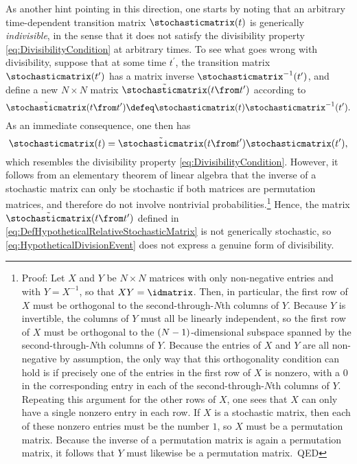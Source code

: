 \documentclass[12pt,english,prl,superscriptaddress,nobibnotes,nofootinbib]{revtex4-2}
\let\originalleft\left
\let\originalright\right
\renewcommand{\left}{\mathopen{}\mathclose\bgroup\originalleft}
\renewcommand{\right}{\aftergroup\egroup\originalright}
\begin{document}
As another hint pointing in this direction, one starts by noting that
an arbitrary time-dependent transition matrix $\stochasticmatrix\left(t\right)$
is generically \emph{indivisible}, in the sense that it does not
satisfy the divisibility property \eqref{eq:DivisibilityCondition}
at arbitrary times. To see what goes wrong with divisibility, suppose
that at some time $t^{\prime}$, the transition matrix $\stochasticmatrix\left(t^{\prime}\right)$
has a matrix inverse $\stochasticmatrix^{-1}\left(t^{\prime}\right)$,
and define a new $N\times N$ matrix $\tilde{\stochasticmatrix}\left(t\from t^{\prime}\right)$
according to 
\begin{equation}
\tilde{\stochasticmatrix}\left(t\from t^{\prime}\right)\defeq\stochasticmatrix\left(t\right)\stochasticmatrix^{-1}\left(t^{\prime}\right).\label{eq:DefHypotheticalRelativeStochasticMatrix}
\end{equation}
 As an immediate consequence, one then has 
\begin{equation}
\stochasticmatrix\left(t\right)=\tilde{\stochasticmatrix}\left(t\from t^{\prime}\right)\stochasticmatrix\left(t^{\prime}\right),\label{eq:HypotheticalDivisionEvent}
\end{equation}
 which resembles the divisibility property \eqref{eq:DivisibilityCondition}.
However, it follows from an elementary theorem of linear algebra that
the inverse of a stochastic matrix can only be stochastic if both
matrices are permutation matrices, and therefore do not involve nontrivial
probabilities.\footnote{Proof: Let $X$ and $Y$ be $N\times N$ matrices with only non-negative
entries and with $Y=X^{-1}$, so that $XY=\idmatrix$. Then, in particular,
the first row of $X$ must be orthogonal to the second-through-$N$th
columns of $Y$. Because $Y$ is invertible, the columns of $Y$ must
all be linearly independent, so the first row of $X$ must be orthogonal
to the $\left(N-1\right)$-dimensional subspace spanned by the second-through-$N$th
columns of $Y$. Because the entries of $X$ and $Y$ are all non-negative
by assumption, the only way that this orthogonality condition can
hold is if precisely one of the entries in the first row of $X$ is
nonzero, with a $0$ in the corresponding entry in each of the second-through-$N$th
columns of $Y$. Repeating this argument for the other rows of $X$,
one sees that $X$ can only have a single nonzero entry in each row.
If $X$ is a stochastic matrix, then each of these nonzero entries
must be the number $1$, so $X$ must be a permutation matrix. Because
the inverse of a permutation matrix is again a permutation matrix,
it follows that $Y$ must likewise be a permutation matrix.~QED} Hence, the matrix $\tilde{\stochasticmatrix}\left(t\from t^{\prime}\right)$
defined in \eqref{eq:DefHypotheticalRelativeStochasticMatrix} is
not generically stochastic, so \eqref{eq:HypotheticalDivisionEvent}
does not express a genuine form of divisibility.
\end{document}

